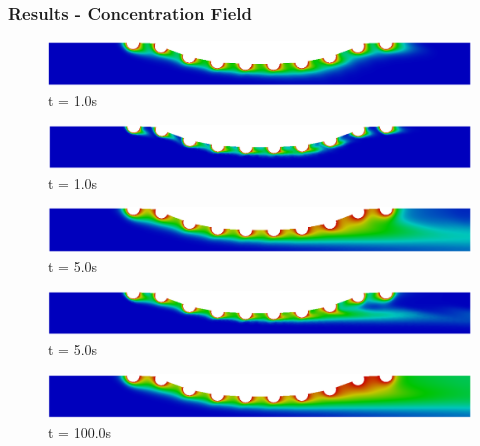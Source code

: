 \begin{frame}
 \frametitle{\LARGE Results - Concentration Field}
\vspace{-0.7cm}
\begin{figure}
     \begin{minipage}{.50\linewidth}
      \centering
      \includegraphics[scale=0.12]{images/conc1_CurvedStrut3.png}\\
      \tiny t = 1.0s
     \end{minipage}%
     \begin{minipage}{.50\linewidth}
      \centering
      \includegraphics[scale=0.12]{images/conc10_CurvedStrut3.png}\\
      \tiny t = 1.0s
     \end{minipage}
     \begin{minipage}{.50\linewidth}
     \medskip
      \centering
      \includegraphics[scale=0.12]{images/conc1_CurvedStrut5.png}\\
      \tiny t = 5.0s
     \end{minipage}%
     \begin{minipage}{.50\linewidth}
     \medskip
      \centering
      \includegraphics[scale=0.12]{images/conc10_CurvedStrut5.png}\\
      \tiny t = 5.0s
     \end{minipage}
     \begin{minipage}{.50\linewidth}
      \centering
      \includegraphics[scale=0.12]{images/conc1_CurvedStrut8.png}\\
      \tiny t = 100.0s

\end{minipage}
\end{figure}
\end{frame}
